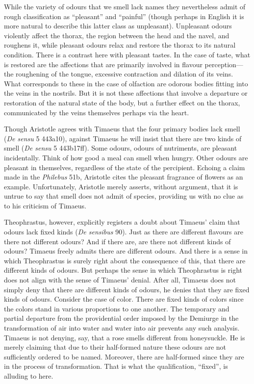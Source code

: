 While the variety of odours that we smell lack names they nevertheless admit of rough classification as ``pleasant'' and ``painful'' (though perhaps in English it is more natural to describe this latter class as unpleasant). Unpleasant odours violently affect the thorax, the region between the head and the navel, and roughens it, while pleasant odours relax and restore the thorax to its natural condition. There is a contrast here with pleasant tastes. In the case of taste, what is restored are the affections that are primarily involved in flavour perception---the roughening of the tongue, excessive contraction and dilation of its veins. What corresponds to these in the case of olfaction are odorous bodies fitting into the veins in the nostrils. But it is not these affections that involve a departure or restoration of the natural state of the body, but a further effect on the thorax, communicated by the veins themselves perhaps via the heart.

Though Aristotle agrees with Timaeus that the four primary bodies lack smell (\emph{De sensu} 5 443a10), against Timaeus he will insist that there are two kinds of smell (\emph{De sensu} 5 443b17ff). Some odours, odours of nutriments, are pleasant incidentally. Think of how good a meal can smell when hungry. Other odours are pleasant in themselves, regardless of the state of the percipient. Echoing a claim made in the \emph{Philebus} 51b, Aristotle cites the pleasant fragrance of flowers as an example. Unfortunately, Aristotle merely asserts, without argument, that it is untrue to say that smell does not admit of species, providing us with no clue as to his criticism of Timaeus. 

Theophrastus, however, explicitly registers a doubt about Timaeus' claim that odours lack fixed kinds (\emph{De sensibus} 90). Just as there are different flavours are there not different odours? And if there are, are there not different kinds of odours? Timaeus freely admits there are different odours. And there is a sense in which Theophrastus is surely right about the consequence of this, that there are different kinds of odours. But perhaps the sense in which Theophrastus is right does not align with the sense of Timaeus' denial. After all, Timaeus does not simply deny that there are different kinds of odours, he denies that they are fixed kinds of odours. Consider the case of color. There are fixed kinds of colors since the colors stand in various proportions to one another. The temporary and partial departure from the providential order imposed by the Demiurge in the transformation of air into water and water into air prevents any such analysis. Timaeus is not denying, say, that a rose smells different from honeysuckle. He is merely claiming that due to their half-formed nature these odours are not sufficiently ordered to be named. Moreover, there are half-formed since they are in the process of transformation. That is what the qualification, ``fixed'', is alluding to here.

